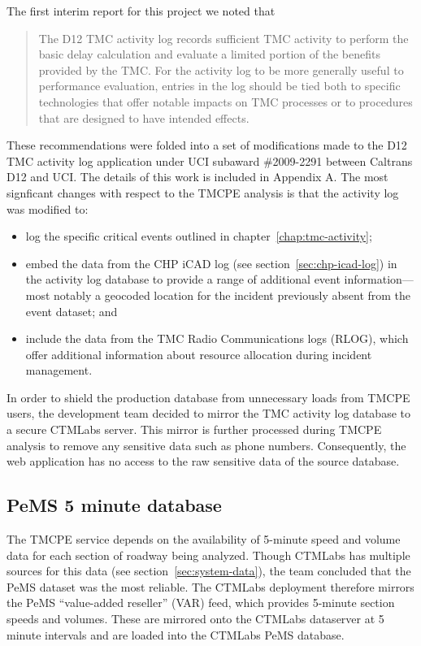 \documentclass[12pt]{report}
\begin{document}
The first interim report for this project
\citep{rindt08:_measur_based_system_for_tmc_perfor_evaluat} we noted
that
\begin{quote}
  The \ac{D12} \ac{TMC} activity log records sufficient \ac{TMC} activity to perform
  the basic delay calculation and evaluate a limited portion of the
  benefits provided by the \ac{TMC}. For the activity log to be more
  generally useful to performance evaluation, entries in the log
  should be tied both to specific technologies that offer notable
  impacts on \ac{TMC} processes or to procedures that are designed to have
  intended effects.
\end{quote}
These recommendations were folded into a set of modifications made to
the \ac{D12} \ac{TMC} activity log application under UCI subaward \#2009-2291
between Caltrans \ac{D12} and UCI.  The details of this work is included in
Appendix A.  The most signficant changes with respect to the \ac{TMCPE}
analysis is that the activity log was modified to:
\begin{itemize}
\item log the specific critical events outlined in
  chapter~\ref{chap:tmc-activity};
\item embed the data from the \ac{CHP} \ac{iCAD} log (see
  section~\ref{sec:chp-icad-log}) in the activity log database to
  provide a range of additional event information---most notably a
  geocoded location for the incident previously absent from the event
  dataset; and
\item include the data from the \ac{TMC} Radio Communications logs (RLOG),
  which offer additional information about resource allocation during
  incident management.
\end{itemize}

In order to shield the production database from unnecessary loads from
\ac{TMCPE} users, the development team decided to mirror the \ac{TMC}
activity log database to a secure \ac{CTMLabs} server.  This mirror is
further processed during \ac{TMCPE} analysis to remove any sensitive
data such as phone numbers.  Consequently, the web application has no
access to the raw sensitive data of the source database.


\subsection{PeMS 5 minute database}
\label{sec:pems-5-min}

The \ac{TMCPE} service depends on the availability of 5-minute speed
and volume data for each section of roadway being analyzed.  Though
\ac{CTMLabs} has multiple sources for this data (see
section~\ref{sec:system-data}), the team concluded that the \ac{PeMS}
dataset was the most reliable.  The \ac{CTMLabs} deployment therefore
mirrors the \ac{PeMS} ``value-added reseller'' (VAR) feed, which
provides 5-minute section speeds and volumes.  These are mirrored onto
the \ac{CTMLabs} dataserver at 5 minute intervals and are loaded into
the \ac{CTMLabs} \ac{PeMS} database.
\end{document}
